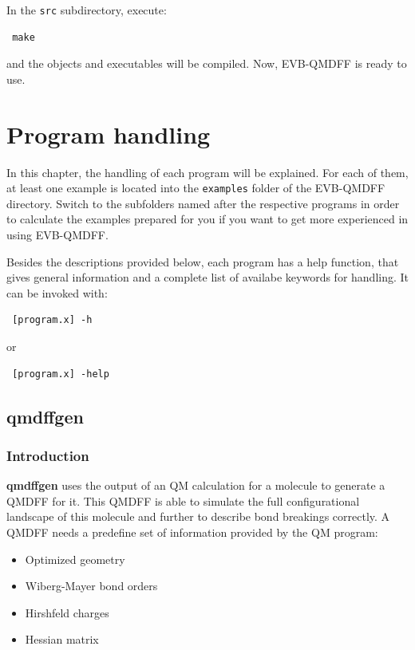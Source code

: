 \documentclass[12pt,a4paper]{scrartcl}
\begin{document}
In the \texttt{src} subdirectory, execute:

\begin{verbatim}
 make
\end{verbatim}

and the objects and executables will be compiled. 
Now, EVB-QMDFF is ready to use.


\newpage


\section{Program handling}

In this chapter, the handling of each program will be explained. For each of them, at least
one example is located into the \texttt{examples} folder of the EVB-QMDFF directory.
Switch to the subfolders named after the respective programs in order to calculate 
the examples prepared for you if you want to get more experienced in using EVB-QMDFF.

Besides the descriptions provided below, each program has a help function, that 
gives general information and a complete list of availabe keywords for handling.
It can be invoked with:

\begin{verbatim}
 [program.x] -h
\end{verbatim}

or 

\begin{verbatim}
 [program.x] -help
\end{verbatim}


\subsection{qmdffgen}

\subsubsection{Introduction}

\textbf{qmdffgen} uses the output of an QM calculation for a molecule to generate a QMDFF for it.
This QMDFF is able to simulate the full configurational landscape of this molecule and further 
to describe bond breakings correctly.
A QMDFF needs a predefine set of information provided by the QM program:

\begin{itemize}
 \item Optimized geometry
 \item Wiberg-Mayer bond orders
 \item Hirshfeld charges 
 \item Hessian matrix
\end{itemize}
\end{document}
